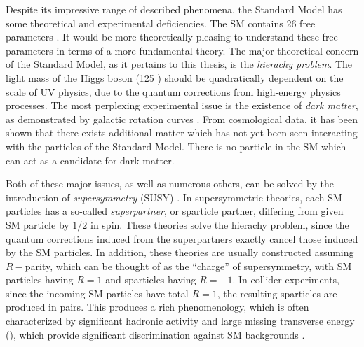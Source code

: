 Despite its impressive range of described phenomena, the Standard Model has some theoretical and experimental deficiencies.
The SM contains 26 free parameters \footnotemark.
It would be more theoretically pleasing to understand these free parameters in terms of a more fundamental theory.
The major theoretical concern of the Standard Model, as it pertains to this thesis, is the \textit{hierachy problem}\cite {Weinberg:1975gm,Weinberg:1979bn, Gildener:1976ai, Susskind:1978ms, susyPrimer}.
The light mass of the Higgs boson (125 \GeV) should be quadratically dependent on the scale of UV physics, due to the quantum corrections from high-energy physics processes.
The most perplexing experimental issue is the existence of \textit{dark matter}, as demonstrated by galactic rotation curves \cite{Rubin:1970zza, Roberts:1970zza, Rubin:1980zd, Rubin:1985ze, Bosma:1981zz, Persic:1995ru, darkMatterPrimer}.
From cosmological data, it has been shown that there exists additional matter which has not yet been seen interacting with the particles of the Standard Model.
There is no particle in the SM which can act as a candidate for dark matter.

Both of these major issues, as well as numerous others, can be solved by the introduction of \textit{supersymmetry} (SUSY) \cite{Miyazawa:1966mfa, Gervais:1971xj, Gervais:1971ji, Golfand:1971iw, Neveu:1971rx, Neveu:1971iv, Volkov:1973ix,  Wess:1973kz, Salam:1974ig, Ferrara:1974ac, Wess:1974tw, susyPrimer}.
In supersymmetric theories, each SM particles has a so-called \textit{superpartner}, or sparticle partner, differing from given SM particle by $1/2$ in spin.
These theories solve the hierachy problem, since the quantum corrections induced from the superpartners exactly cancel those induced by the SM particles.
In addition, these theories are usually constructed assuming $R-$parity, which can be thought of as the ``charge'' of supersymmetry, with SM particles having $R=1$ and sparticles having $R=-1$.
In collider experiments, since the incoming SM particles have total $R=1$, the resulting sparticles are produced in pairs.
This produces a rich phenomenology, which is often characterized by significant hadronic activity and large missing transverse energy (\met), which provide significant discrimination against SM backgrounds \cite{Farrar:1978xj}.


